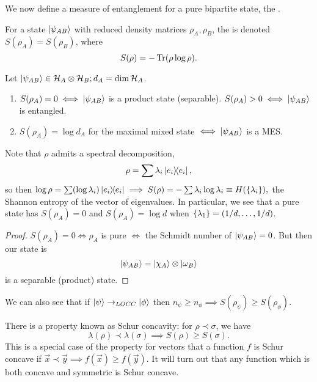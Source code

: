 We now define a measure of entanglement for a pure bipartite state, the .
\begin{defn}
    For a state $\lvert\psi_{AB}\rangle$ with reduced density matrices $\rho_A,\rho_B$, the  is denoted $S(\rho_A)=S(\rho_B)$, where
    \begin{equation}
         S(\rho)=-\operatorname{Tr}(\rho\log \rho).
    \end{equation}
\end{defn}
\begin{thm}
    Let $\lvert\psi_{AB}\rangle\in \mathcal H_A \otimes \mathcal H_B; d_A =\dim \mathcal H_A$.
    \begin{enumerate}
        \item $S(\rho_A)=0 \iff \lvert\psi_{AB}\rangle$ is a product state (separable). $S(\rho_A) >0 \iff \lvert\psi_{AB}\rangle$ is entangled.
        \item $S(\rho_A) = \log d_A$ for the maximal mixed state $\iff \lvert\psi_{AB}\rangle$ is a MES.
    \end{enumerate}
\end{thm}
Note that $\rho$ admits a spectral decomposition,
\begin{equation}
    \rho=\sum \lambda_i \left\lvert{e_i}\middle\rangle\!\middle\langle{e_i}\right\rvert,
\end{equation}
so then $\log\rho=\sum(\log\lambda_i) \left\lvert{e_i}\middle\rangle\!\middle\langle{e_i}\right\rvert \implies S(\rho)=-\sum \lambda_i \log \lambda_i \equiv H(\{\lambda_i\}),$
the Shannon entropy of the vector of eigenvalues. In particular, we see that a pure state has $S(\rho_A)=0$ and $S(\rho_A)=\log d$ when $\{\lambda_1\}=(1/d,\ldots,1/d)$.

\begin{proof}
    $S(\rho_A)=0 \iff \rho_A$ is pure $\iff$ the Schmidt number of $\lvert\psi_{AB}\rangle=0$. But then our state is
    \begin{equation}
        \lvert\psi_{AB}\rangle=\lvert\chi_A\rangle\otimes \lvert\omega_B\rangle
    \end{equation}
    is a separable (product) state.
\end{proof}
We can also see that if $\lvert\psi\rangle\to_{LOCC}\lvert\phi\rangle$ then $n_\psi \geq n_\phi \implies S(\rho_\psi)\geq S(\rho_\phi)$.

There is a property known as Schur concavity: for $\rho \prec \sigma$, we have
\begin{equation}
    \lambda(\rho)\prec \lambda(\sigma) \implies S(\rho)\geq S(\sigma).
\end{equation}
This is a special case of the property for vectors that a function $f$ is Schur concave if $\vec x \prec \vec y \implies f(\vec x) \geq f(\vec y)$. It will turn out that any function which is both concave and symmetric is Schur concave.

